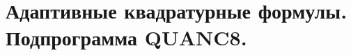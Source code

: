 \documentclass[../../calc-math-exam-2023.tex]{subfiles}
\begin{document}
    \section{Адаптивные квадратурные формулы. Подпрограмма \textbf{QUANC8}.}\label{sec:ch11}
\end{document}
